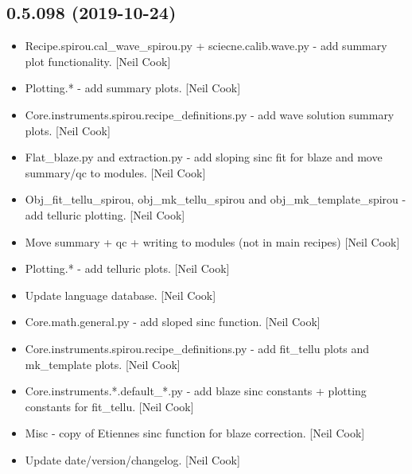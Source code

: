 \documentclass[a4paper,10pt,english]{report}
\begin{document}
\subsection{0.5.098 (2019-10-24)}
\label{\detokenize{misc/changelog:id43}}\begin{itemize}
\item {} 
Recipe.spirou.cal\_wave\_spirou.py + sciecne.calib.wave.py - add summary
plot functionality. {[}Neil Cook{]}

\item {} 
Plotting.* - add summary plots. {[}Neil Cook{]}

\item {} 
Core.instruments.spirou.recipe\_definitions.py - add wave solution
summary plots. {[}Neil Cook{]}

\item {} 
Flat\_blaze.py and extraction.py - add sloping sinc fit for blaze and
move summary/qc to modules. {[}Neil Cook{]}

\item {} 
Obj\_fit\_tellu\_spirou, obj\_mk\_tellu\_spirou and obj\_mk\_template\_spirou -
add telluric plotting. {[}Neil Cook{]}

\item {} 
Move summary + qc + writing to modules (not in main recipes) {[}Neil
Cook{]}

\item {} 
Plotting.* - add telluric plots. {[}Neil Cook{]}

\item {} 
Update language database. {[}Neil Cook{]}

\item {} 
Core.math.general.py - add sloped sinc function. {[}Neil Cook{]}

\item {} 
Core.instruments.spirou.recipe\_definitions.py - add fit\_tellu plots
and mk\_template plots. {[}Neil Cook{]}

\item {} 
Core.instruments.*.default\_*.py - add blaze sinc constants + plotting
constants for fit\_tellu. {[}Neil Cook{]}

\item {} 
Misc - copy of Etiennes sinc function for blaze correction. {[}Neil
Cook{]}

\item {} 
Update date/version/changelog. {[}Neil Cook{]}

\end{itemize}
\end{document}
